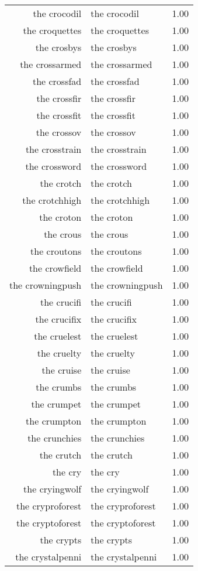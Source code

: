 \begin{table}[ht]
\begin{tabular}{rlr}
  the crocodil & the crocodil & 1.00 \\ 
  the croquettes & the croquettes & 1.00 \\ 
  the crosbys & the crosbys & 1.00 \\ 
  the crossarmed & the crossarmed & 1.00 \\ 
  the crossfad & the crossfad & 1.00 \\ 
  the crossfir & the crossfir & 1.00 \\ 
  the crossfit & the crossfit & 1.00 \\ 
  the crossov & the crossov & 1.00 \\ 
  the crosstrain & the crosstrain & 1.00 \\ 
  the crossword & the crossword & 1.00 \\ 
  the crotch & the crotch & 1.00 \\ 
  the crotchhigh & the crotchhigh & 1.00 \\ 
  the croton & the croton & 1.00 \\ 
  the crous & the crous & 1.00 \\ 
  the croutons & the croutons & 1.00 \\ 
  the crowfield & the crowfield & 1.00 \\ 
  the crowningpush & the crowningpush & 1.00 \\ 
  the crucifi & the crucifi & 1.00 \\ 
  the crucifix & the crucifix & 1.00 \\ 
  the cruelest & the cruelest & 1.00 \\ 
  the cruelty & the cruelty & 1.00 \\ 
  the cruise & the cruise & 1.00 \\ 
  the crumbs & the crumbs & 1.00 \\ 
  the crumpet & the crumpet & 1.00 \\ 
  the crumpton & the crumpton & 1.00 \\ 
  the crunchies & the crunchies & 1.00 \\ 
  the crutch & the crutch & 1.00 \\ 
  the cry & the cry & 1.00 \\ 
  the cryingwolf & the cryingwolf & 1.00 \\ 
  the cryproforest & the cryproforest & 1.00 \\ 
  the cryptoforest & the cryptoforest & 1.00 \\ 
  the crypts & the crypts & 1.00 \\ 
  the crystalpenni & the crystalpenni & 1.00 \\ 

\end{tabular}
\end{table}
